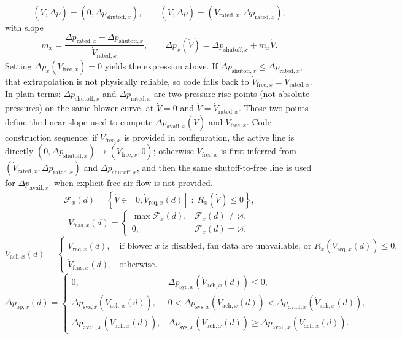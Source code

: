\documentclass[11pt]{article}
\begin{document}
\[
(\dot V,\Delta p)=(0,\Delta p_{\mathrm{shutoff},x}),
\qquad
(\dot V,\Delta p)=(\dot V_{\mathrm{rated},x},\Delta p_{\mathrm{rated},x}),
\]
with slope
\[
m_x=\frac{\Delta p_{\mathrm{rated},x}-\Delta p_{\mathrm{shutoff},x}}{\dot V_{\mathrm{rated},x}},
\qquad
\Delta p_x(\dot V)=\Delta p_{\mathrm{shutoff},x}+m_x\dot V.
\]
Setting \(\Delta p_x(\dot V_{\mathrm{free},x})=0\) yields the expression above. If \(\Delta p_{\mathrm{shutoff},x}\le\Delta p_{\mathrm{rated},x}\), that extrapolation is not physically reliable, so code falls back to \(\dot V_{\mathrm{free},x}=\dot V_{\mathrm{rated},x}\).
In plain terms: \(\Delta p_{\mathrm{shutoff},x}\) and \(\Delta p_{\mathrm{rated},x}\) are two pressure-rise points (not absolute pressures) on the same blower curve, at \(\dot V=0\) and \(\dot V=\dot V_{\mathrm{rated},x}\). Those two points define the linear slope used to compute \(\Delta p_{\mathrm{avail},x}(\dot V)\) and \(\dot V_{\mathrm{free},x}\).
Code construction sequence: if \(\dot V_{\mathrm{free},x}\) is provided in configuration, the active line is directly \((0,\Delta p_{\mathrm{shutoff},x})\rightarrow(\dot V_{\mathrm{free},x},0)\); otherwise \(\dot V_{\mathrm{free},x}\) is first inferred from \((\dot V_{\mathrm{rated},x},\Delta p_{\mathrm{rated},x})\) and \(\Delta p_{\mathrm{shutoff},x}\), and then the same shutoff-to-free line is used for \(\Delta p_{\mathrm{avail},x}\).
when explicit free-air flow is not provided.
\[
\mathcal{F}_x(d)=
\left\{
\dot V\in[0,\dot V_{\mathrm{req},x}(d)]
\;:\;
R_x(\dot V)\le 0
\right\},
\]
\[
\dot V_{\mathrm{feas},x}(d)=
\begin{cases}
\max \mathcal{F}_x(d), & \mathcal{F}_x(d)\neq\varnothing,\\[4pt]
0, & \mathcal{F}_x(d)=\varnothing,
\end{cases}
\]
\[
\dot V_{\mathrm{ach},x}(d)=
\begin{cases}
\dot V_{\mathrm{req},x}(d), & \text{if blower \(x\) is disabled, fan data are unavailable, or }R_x(\dot V_{\mathrm{req},x}(d))\le 0,\\[4pt]
\dot V_{\mathrm{feas},x}(d), & \text{otherwise}.
\end{cases}
\]
\[
\Delta p_{\mathrm{op},x}(d)=
\begin{cases}
0, & \Delta p_{\mathrm{sys},x}(\dot V_{\mathrm{ach},x}(d))\le 0,\\[4pt]
\Delta p_{\mathrm{sys},x}(\dot V_{\mathrm{ach},x}(d)), &
0<\Delta p_{\mathrm{sys},x}(\dot V_{\mathrm{ach},x}(d))
<\Delta p_{\mathrm{avail},x}(\dot V_{\mathrm{ach},x}(d)),\\[4pt]
\Delta p_{\mathrm{avail},x}(\dot V_{\mathrm{ach},x}(d)), &
\Delta p_{\mathrm{sys},x}(\dot V_{\mathrm{ach},x}(d))
\ge\Delta p_{\mathrm{avail},x}(\dot V_{\mathrm{ach},x}(d)).
\end{cases}
\]
\end{document}
